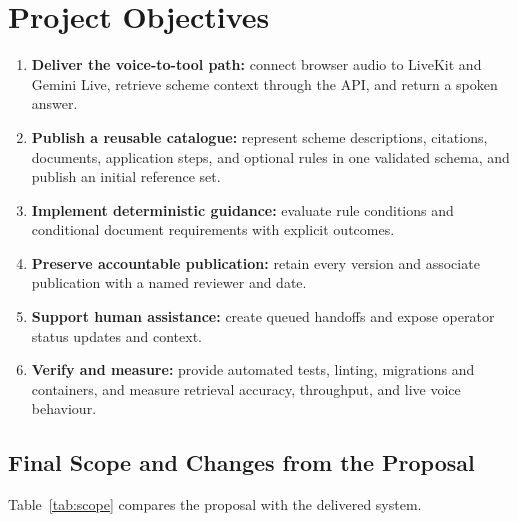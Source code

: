 \documentclass[11pt,a4paper,oneside]{report}
\begin{document}
\section{Project Objectives}
\begin{enumerate}
  \item \textbf{Deliver the voice-to-tool path:} connect browser audio to LiveKit
    and Gemini Live, retrieve scheme context through the API, and return a spoken
    answer.
  \item \textbf{Publish a reusable catalogue:} represent scheme descriptions,
    citations, documents, application steps, and optional rules in one validated
    schema, and publish an initial reference set.
  \item \textbf{Implement deterministic guidance:} evaluate rule conditions and
    conditional document requirements with explicit outcomes.
  \item \textbf{Preserve accountable publication:} retain every version and
    associate publication with a named reviewer and date.
  \item \textbf{Support human assistance:} create queued handoffs and expose
    operator status updates and context.
  \item \textbf{Verify and measure:} provide automated tests, linting, migrations
    and containers, and measure retrieval accuracy, throughput, and live voice
    behaviour.
\end{enumerate}

\subsection{Final Scope and Changes from the Proposal}
Table~\ref{tab:scope} compares the proposal with the delivered system.
\end{document}
